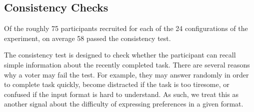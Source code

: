 \documentclass{comsoc2023}
\begin{document}
\subsection{Consistency Checks}

Of the roughly 75 participants  recruited for each of the 24 configurations of the experiment, on average 58 passed the consistency test. 

The consistency test  is designed to check whether the participant can recall simple information about the recently completed task. 
%
There are several reasons why a voter may fail the test. For example, they may answer randomly in order to complete task quickly,  become  distracted  if the task is too tiresome, or confused if the input format is hard to understand. As such, we  treat this as another signal about the difficulty of expressing  preferences in a given format. 







\end{document}
